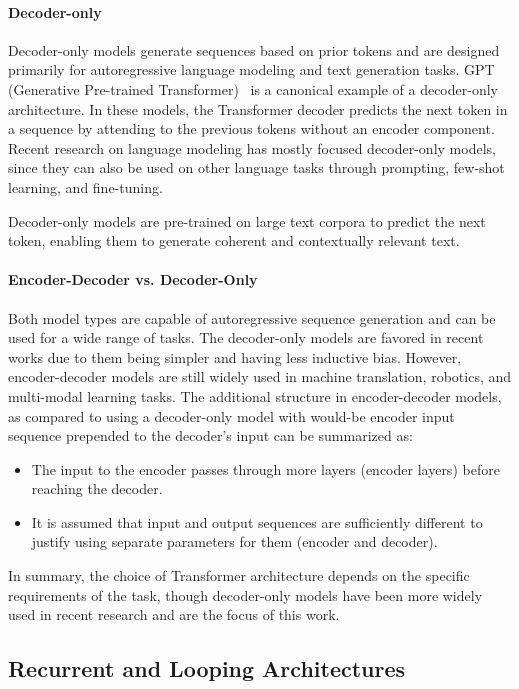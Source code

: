 \paragraph{Decoder-only}

Decoder-only models generate sequences based on prior tokens and are designed primarily for autoregressive language modeling and text generation tasks. GPT (Generative Pre-trained Transformer)~\cite{radford_improving_2018} is a canonical example of a decoder-only architecture. In these models, the Transformer decoder predicts the next token in a sequence by attending to the previous tokens without an encoder component. Recent research on language modeling has mostly focused decoder-only models, since they can also be used on other language tasks through prompting, few-shot learning, and fine-tuning.

Decoder-only models are pre-trained on large text corpora to predict the next token, enabling them to generate coherent and contextually relevant text.

\bigskip

\paragraph{Encoder-Decoder vs. Decoder-Only} Both model types are capable of autoregressive sequence generation and can be used for a wide range of tasks. The decoder-only models are favored in recent works due to them being simpler and having less inductive bias. However, encoder-decoder models are still widely used in machine translation, robotics, and multi-modal learning tasks. The additional structure in encoder-decoder models, as compared to using a decoder-only model with would-be encoder input sequence prepended to the decoder's input can be summarized as:
\begin{itemize}
    \item The input to the encoder passes through more layers (encoder layers) before reaching the decoder.
    \item It is assumed that input and output sequences are sufficiently different to justify using separate parameters for them (encoder and decoder).
\end{itemize}

In summary, the choice of Transformer architecture depends on the specific requirements of the task, though decoder-only models have been more widely used in recent research and are the focus of this work.

\subsection{Recurrent and Looping Architectures}\label{subsec:recurrent_looping}

